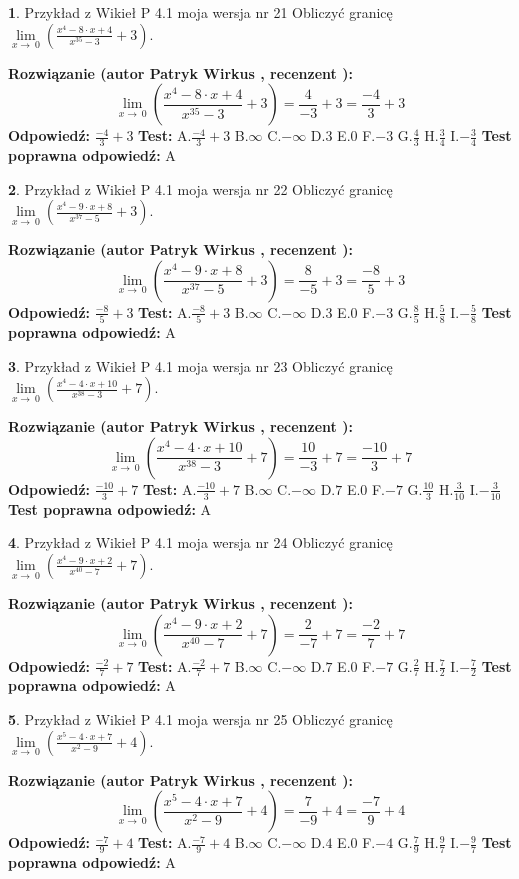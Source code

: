 \documentclass[12pt, a4paper]{article}
\theoremstyle{definition} %
\newtheorem{zad}{}
\newcommand{\zadStart}[1]{\begin{zad}#1\newline}
\newcommand{\zadStop}{\end{zad}}
\newcommand{\rozwStart}[2]{\noindent \textbf{Rozwiązanie (autor #1 , recenzent #2): }\newline}
\newcommand{\rozwStop}{\newline}
\newcommand{\odpStart}{\noindent \textbf{Odpowiedź:}\newline}
\newcommand{\odpStop}{\newline}
\newcommand{\testStart}{\noindent \textbf{Test:}\newline}
\newcommand{\testStop}{\newline}
\newcommand{\kluczStart}{\noindent \textbf{Test poprawna odpowiedź:}\newline}
\newcommand{\kluczStop}{\newline}
\begin{document}
\zadStart{Przykład z Wikieł P 4.1 moja wersja nr 21}
Obliczyć granicę $\lim\limits_{x\to\ 0}(\frac{x^{4}-8 \cdot x +4}{x^{35}-3}+3)$.
\zadStop
\rozwStart{Patryk Wirkus}{}
$$\lim\limits_{x\to\ 0}(\frac{x^{4}-8 \cdot x +4}{x^{35}-3}+3)=\frac{4}{-3}+3=\frac{-4}{3}+3$$
\rozwStop
\odpStart
$\frac{-4}{3}+3$
\odpStop
\testStart
A.$\frac{-4}{3}+3$
B.$\infty$
C.$-\infty$
D.$3$
E.$0$
F.$-3$
G.$\frac{4}{3}$
H.$\frac{3}{4}$
I.$-\frac{3}{4}$
\testStop
\kluczStart
A
\kluczStop



\zadStart{Przykład z Wikieł P 4.1 moja wersja nr 22}
Obliczyć granicę $\lim\limits_{x\to\ 0}(\frac{x^{4}-9 \cdot x +8}{x^{37}-5}+3)$.
\zadStop
\rozwStart{Patryk Wirkus}{}
$$\lim\limits_{x\to\ 0}(\frac{x^{4}-9 \cdot x +8}{x^{37}-5}+3)=\frac{8}{-5}+3=\frac{-8}{5}+3$$
\rozwStop
\odpStart
$\frac{-8}{5}+3$
\odpStop
\testStart
A.$\frac{-8}{5}+3$
B.$\infty$
C.$-\infty$
D.$3$
E.$0$
F.$-3$
G.$\frac{8}{5}$
H.$\frac{5}{8}$
I.$-\frac{5}{8}$
\testStop
\kluczStart
A
\kluczStop



\zadStart{Przykład z Wikieł P 4.1 moja wersja nr 23}
Obliczyć granicę $\lim\limits_{x\to\ 0}(\frac{x^{4}-4 \cdot x +10}{x^{38}-3}+7)$.
\zadStop
\rozwStart{Patryk Wirkus}{}
$$\lim\limits_{x\to\ 0}(\frac{x^{4}-4 \cdot x +10}{x^{38}-3}+7)=\frac{10}{-3}+7=\frac{-10}{3}+7$$
\rozwStop
\odpStart
$\frac{-10}{3}+7$
\odpStop
\testStart
A.$\frac{-10}{3}+7$
B.$\infty$
C.$-\infty$
D.$7$
E.$0$
F.$-7$
G.$\frac{10}{3}$
H.$\frac{3}{10}$
I.$-\frac{3}{10}$
\testStop
\kluczStart
A
\kluczStop



\zadStart{Przykład z Wikieł P 4.1 moja wersja nr 24}
Obliczyć granicę $\lim\limits_{x\to\ 0}(\frac{x^{4}-9 \cdot x +2}{x^{40}-7}+7)$.
\zadStop
\rozwStart{Patryk Wirkus}{}
$$\lim\limits_{x\to\ 0}(\frac{x^{4}-9 \cdot x +2}{x^{40}-7}+7)=\frac{2}{-7}+7=\frac{-2}{7}+7$$
\rozwStop
\odpStart
$\frac{-2}{7}+7$
\odpStop
\testStart
A.$\frac{-2}{7}+7$
B.$\infty$
C.$-\infty$
D.$7$
E.$0$
F.$-7$
G.$\frac{2}{7}$
H.$\frac{7}{2}$
I.$-\frac{7}{2}$
\testStop
\kluczStart
A
\kluczStop



\zadStart{Przykład z Wikieł P 4.1 moja wersja nr 25}
Obliczyć granicę $\lim\limits_{x\to\ 0}(\frac{x^{5}-4 \cdot x +7}{x^{2}-9}+4)$.
\zadStop
\rozwStart{Patryk Wirkus}{}
$$\lim\limits_{x\to\ 0}(\frac{x^{5}-4 \cdot x +7}{x^{2}-9}+4)=\frac{7}{-9}+4=\frac{-7}{9}+4$$
\rozwStop
\odpStart
$\frac{-7}{9}+4$
\odpStop
\testStart
A.$\frac{-7}{9}+4$
B.$\infty$
C.$-\infty$
D.$4$
E.$0$
F.$-4$
G.$\frac{7}{9}$
H.$\frac{9}{7}$
I.$-\frac{9}{7}$
\testStop
\kluczStart
A
\kluczStop
\end{document}
